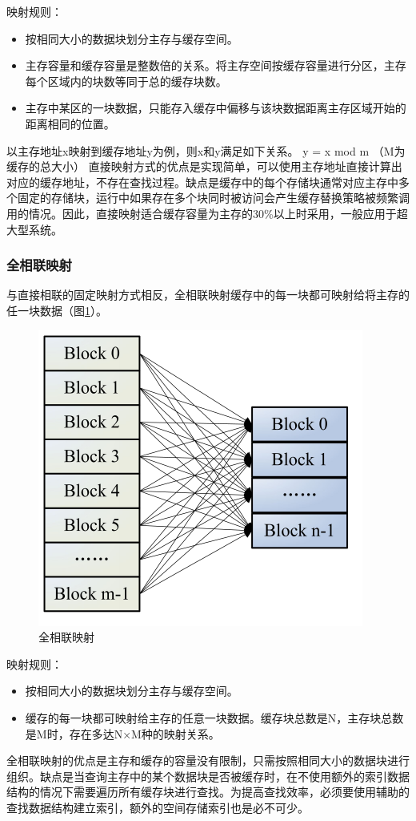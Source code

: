 映射规则：
\begin{itemize}
\item 按相同大小的数据块划分主存与缓存空间。
\item 主存容量和缓存容量是整数倍的关系。将主存空间按缓存容量进行分区，主存每个区域内的块数等同于总的缓存块数。 
\item 主存中某区的一块数据，只能存入缓存中偏移与该块数据距离主存区域开始的距离相同的位置。
\end{itemize}

以主存地址x映射到缓存地址y为例，则x和y满足如下关系。
y = x mod m	（M为缓存的总大小）
直接映射方式的优点是实现简单，可以使用主存地址直接计算出对应的缓存地址，不存在查找过程。缺点是缓存中的每个存储块通常对应主存中多个固定的存储块，运行中如果存在多个块同时被访问会产生缓存替换策略被频繁调用的情况。因此，直接映射适合缓存容量为主存的30\%以上时采用，一般应用于超大型系统。

\subsubsection{全相联映射}

与直接相联的固定映射方式相反，全相联映射缓存中的每一块都可映射给将主存的任一块数据（图\ref{fig:cache-map-2}）。

\begin{figure}[H]
\centering
\includegraphics[width=0.3\linewidth]{./graph/cache-map-2}
\caption{全相联映射}
\label{fig:cache-map-2}
\end{figure}

映射规则：
\begin{itemize}
\item 按相同大小的数据块划分主存与缓存空间。
\item 缓存的每一块都可映射给主存的任意一块数据。缓存块总数是N，主存块总数是M时，存在多达N×M种的映射关系。
\end{itemize}

全相联映射的优点是主存和缓存的容量没有限制，只需按照相同大小的数据块进行组织。缺点是当查询主存中的某个数据块是否被缓存时，在不使用额外的索引数据结构的情况下需要遍历所有缓存块进行查找。为提高查找效率，必须要使用辅助的查找数据结构建立索引，额外的空间存储索引也是必不可少。

